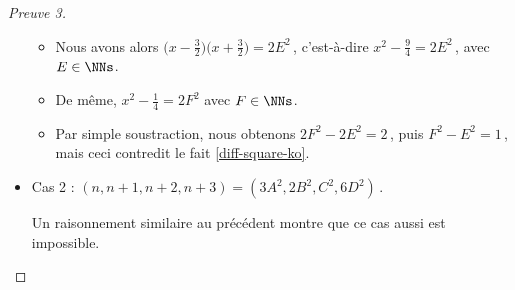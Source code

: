 \begin{proof}[Preuve 3]
\begin{itemize}
\begin{itemize}
        	\item Nous avons alors
        	$\big( x - \frac32 \big) \big( x + \frac32 \big) = 2 E^2$\,, c'est-à-dire $x^2 - \frac94 = 2 E^2$\,, avec $E \in \NNs$.
        
        	\item De même,
        	$x^2 - \frac14 = 2 F^2$ avec $F \in \NNs$.	
        
        	\item Par simple soustraction, nous obtenons $2 F^2 - 2 E^2 = 2$\,, puis $F^2 - E^2 = 1$\,, mais ceci contredit le fait \ref{diff-square-ko}.
        \end{itemize}
    	
	
		\item Cas 2 : $(n, n+1, n+2, n+3) = (3A^2, 2B^2, C^2, 6D^2)$\,.
		
		\smallskip
		\noindent
		Un raisonnement similaire au précédent montre que ce cas aussi est impossible.
    \end{itemize}
\end{proof}

